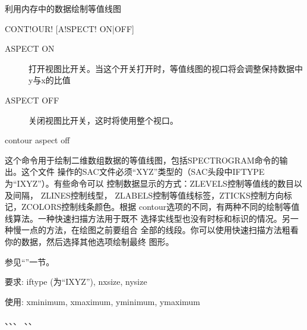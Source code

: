 \label{cmd:contour}

利用内存中的数据绘制等值线图

\begin{SACSTX}
CONT!OUR! [A!SPECT! ON|OFF]
\end{SACSTX}

\begin{description}
\item [ASPECT ON] 打开视图比开关。当这个开关打开时，等值线图的视口将会调整保持数据中y与x的比值
\item [ASPECT OFF] 关闭视图比开关，这时将使用整个视口。
\end{description}

\begin{SACDFT}
contour  aspect  off
\end{SACDFT}

这个命令用于绘制二维数组数据的等值线图，包括SPECTROGRAM命令的输出。这个文件
操作的SAC文件必须``XYZ''类型的（SAC头段中IFTYPE为``IXYZ''）。有些命令可以
控制数据显示的方式：ZLEVELS控制等值线的数目以及间隔， ZLINES控制线型，
ZLABELS控制等值线标签，ZTICKS控制方向标记，ZCOLORS控制线条颜色。根据
contour选项的不同，有两种不同的绘制等值线算法。一种快速扫描方法用于既不
选择实线型也没有时标和标识的情况。另一种慢一点的方法，在绘图之前要组合
全部的线段。你可以使用快速扫描方法粗看你的数据，然后选择其他选项绘制最终
图形。

参见``''一节。

要求: iftype (为``IXYZ''), nxsize, nysize

使用: xminimum, xmaximum, yminimum, ymaximum

、、、
、、
